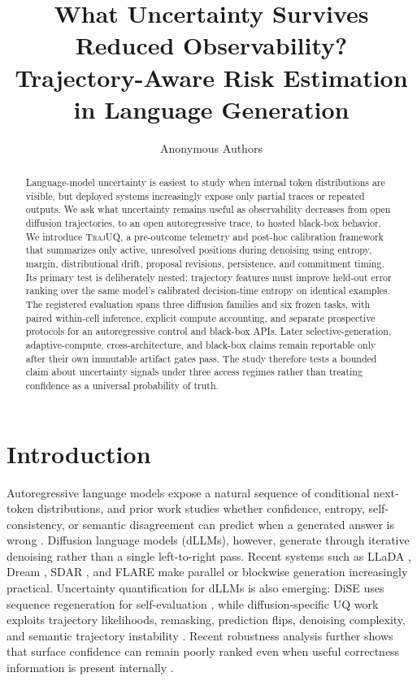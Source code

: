 \documentclass[10pt]{article}
\title{What Uncertainty Survives Reduced Observability?\\
Trajectory-Aware Risk Estimation in Language Generation}
\author{\name Anonymous Authors}
\newcommand{\method}{\textsc{TrajUQ}\xspace}
\begin{document}
\maketitle
{}

\begin{abstract}
Language-model uncertainty is easiest to study when internal token distributions are visible, but deployed systems increasingly expose only partial traces or repeated outputs.
We ask what uncertainty remains useful as observability decreases from open diffusion trajectories, to an open autoregressive trace, to hosted black-box behavior.
We introduce \method, a pre-outcome telemetry and post-hoc calibration framework that summarizes only active, unresolved positions during denoising using entropy, margin, distributional drift, proposal revisions, persistence, and commitment timing.
Its primary test is deliberately nested: trajectory features must improve held-out error ranking over the same model's calibrated decision-time entropy on identical examples.
The registered evaluation spans three diffusion families and six frozen tasks, with paired within-cell inference, explicit compute accounting, and separate prospective protocols for an autoregressive control and black-box APIs.
\AbstractResultSentence
Later selective-generation, adaptive-compute, cross-architecture, and black-box claims remain reportable only after their own immutable artifact gates pass.
The study therefore tests a bounded claim about uncertainty signals under three access regimes rather than treating confidence as a universal probability of truth.
\end{abstract}

\section{Introduction}
Autoregressive language models expose a natural sequence of conditional next-token distributions, and prior work studies whether confidence, entropy, self-consistency, or semantic disagreement can predict when a generated answer is wrong \citep{jiang2021know,kuhn2023semantic,farquhar2024semantic,kapoor2024taught}.
Diffusion language models (dLLMs), however, generate through iterative denoising rather than a single left-to-right pass.
Recent systems such as LLaDA \citep{nie2025llada}, Dream \citep{ye2025dream}, SDAR \citep{cheng2026sdar}, and FLARE \citep{zhu2026flare} make parallel or blockwise generation increasingly practical.
Uncertainty quantification for dLLMs is also emerging: DiSE uses sequence regeneration for self-evaluation \citep{zhong2026dise}, while diffusion-specific UQ work exploits trajectory likelihoods, remasking, prediction flips, denoising complexity, and semantic trajectory instability \citep{vazhentsev2026dllmuq}. Recent robustness analysis further shows that surface confidence can remain poorly ranked even when useful correctness information is present internally \citep{yadav2026unsure}.
\end{document}
